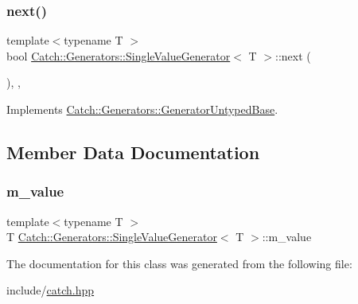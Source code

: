 \mbox{\label{class_catch_1_1_generators_1_1_single_value_generator_a10833b34e3ccbc484624185712eb8b6e}} 
\subsubsection{\texorpdfstring{next()}{next()}}
{\footnotesize\ttfamily template$<$typename T $>$ \\
bool \mbox{\hyperlink{class_catch_1_1_generators_1_1_single_value_generator}{Catch\+::\+Generators\+::\+Single\+Value\+Generator}}$<$ T $>$\+::next (\begin{DoxyParamCaption}{ }\end{DoxyParamCaption})\hspace{0.3cm}{\ttfamily [inline]}, {\ttfamily [override]}, {\ttfamily [virtual]}}



Implements \mbox{\hyperlink{class_catch_1_1_generators_1_1_generator_untyped_base_aeed3c0cd6233c5f553549e453b8d6638}{Catch\+::\+Generators\+::\+Generator\+Untyped\+Base}}.



\subsection{Member Data Documentation}
\mbox{\label{class_catch_1_1_generators_1_1_single_value_generator_a93402a3203dad8ae7edcd681b1ed5938}} 
\subsubsection{\texorpdfstring{m\_value}{m\_value}}
{\footnotesize\ttfamily template$<$typename T $>$ \\
T \mbox{\hyperlink{class_catch_1_1_generators_1_1_single_value_generator}{Catch\+::\+Generators\+::\+Single\+Value\+Generator}}$<$ T $>$\+::m\+\_\+value\hspace{0.3cm}{\ttfamily [private]}}



The documentation for this class was generated from the following file\+:\begin{DoxyCompactItemize}
\item 
include/\mbox{\hyperlink{catch_8hpp}{catch.\+hpp}}\end{DoxyCompactItemize}
